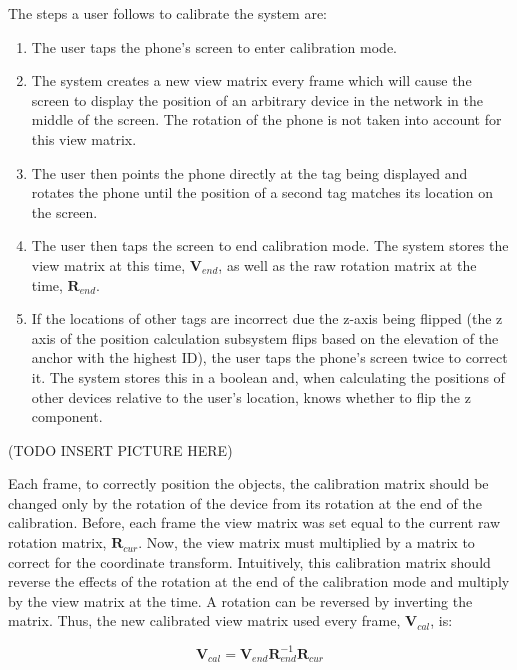 The steps a user follows to calibrate the system are:
\begin{enumerate}
	\item The user taps the phone's screen to enter calibration mode.
	\item The system creates a new view matrix every frame which will cause the screen to display the position of an arbitrary device in the network in the middle of the screen. The rotation of the phone is not taken into account for this view matrix.
	\item The user then points the phone directly at the tag being displayed and rotates the phone until the position of a second tag matches its location on the screen.
	\item The user then taps the screen to end calibration mode. The system stores the view matrix at this time, $\mathbf{V}_{end}$, as well as the raw rotation matrix at the time, $\mathbf{R}_{end}$.
	\item If the locations of other tags are incorrect due the z-axis being flipped (the z axis of the position calculation subsystem flips based on the elevation of the anchor with the highest ID), the user taps the phone's screen twice to correct it. The system stores this in a boolean and, when calculating the positions of other devices relative to the user's location, knows whether to flip the z component.
\end{enumerate}

(TODO INSERT PICTURE HERE)

Each frame, to correctly position the objects, the calibration matrix should be changed only by the rotation of the device from its rotation at the end of the calibration. Before, each frame the view matrix was set equal to the current raw rotation matrix, $\mathbf{R}_{cur}$. Now, the view matrix must multiplied by a matrix to correct for the coordinate transform. Intuitively, this calibration matrix should reverse the effects of the rotation at the end of the calibration mode and multiply by the view matrix at the time. A rotation can be reversed by inverting the matrix. Thus, the new calibrated view matrix used every frame, $\mathbf{V}_{cal}$, is:

\[ 
	\mathbf{V}_{cal} = \mathbf{V}_{end} \mathbf{R}^{-1}_{end} \mathbf{R}_{cur}
\]

